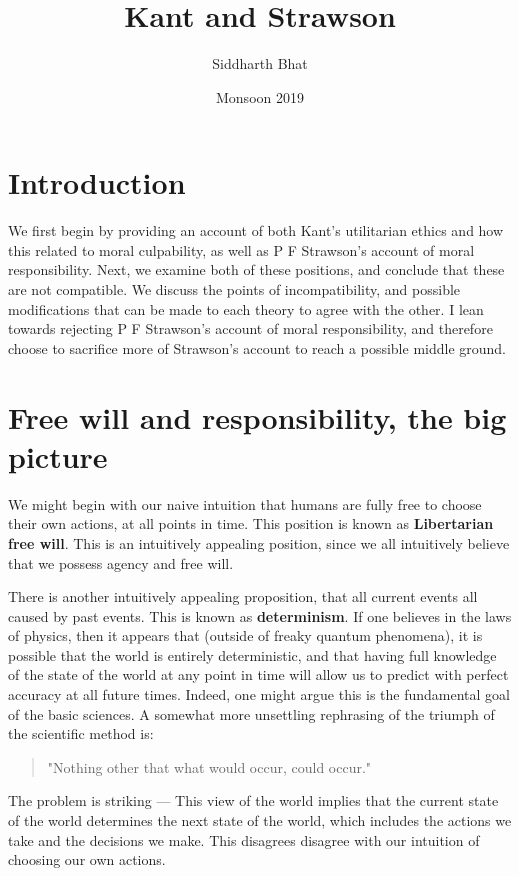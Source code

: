 \documentclass{article}
\title{Kant and Strawson}
\author{Siddharth Bhat}
\date{Monsoon 2019}
\begin{document}
 
\maketitle

\section{Introduction}
We first begin by providing an account of both Kant's utilitarian ethics and
how this related to moral culpability, as well as P F Strawson's account of
moral responsibility. Next, we examine both of these positions, and conclude
that these are not compatible. We discuss the points of incompatibility, and
possible modifications that can be made to each theory to agree with the other.
I lean towards rejecting P F Strawson's account of moral responsibility, and
therefore choose to sacrifice more of Strawson's account to reach a possible
middle ground.

\section{Free will and responsibility, the big picture}
We might begin with our naive intuition that humans are fully free to choose
their own actions, at all points in time. This position is known as
\textbf{Libertarian free will}. This is an intuitively appealing position, since
we all intuitively believe that we possess agency and free will.

There is another intuitively appealing proposition, that all current events all
caused by past events. This is known as \textbf{determinism}. 
If one believes in the laws of physics, then it appears
that (outside of freaky quantum phenomena), it is possible that the world
is entirely deterministic, and that having full knowledge of the state of
the world at any point in time will allow us to predict with
perfect accuracy at all future times. Indeed, one might argue this is the fundamental
goal of the basic sciences. A somewhat more unsettling rephrasing of the triumph of the scientific method is:
\begin{quote}
"Nothing other that what would occur, could occur."
\end{quote}

The problem is striking --- This view of the world implies that the current
state of the world determines the next state of the world, which includes the
actions we take and the decisions we make. This disagrees
disagree with our intuition of choosing our own actions.
\end{document}
